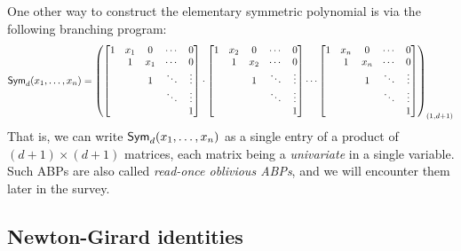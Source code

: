 One other way to construct the elementary symmetric polynomial is via the following branching program:
\[
\operatorname{\mathsf{Sym}}_d(x_1,\ldots, x_n) = \left(\begin{bmatrix} 
  1 & x_1 & 0   & \cdots & 0\\
    & 1   & x_1 & \cdots & 0\\
    &    &  1 & \ddots & \vdots\\
    & &  & \ddots & \vdots\\
  & &  &  & 1
\end{bmatrix}\cdot \begin{bmatrix} 
  1 & x_2 & 0   & \cdots & 0\\
    & 1   & x_2 & \cdots & 0\\
    &    &  1 & \ddots & \vdots\\
    & &  & \ddots & \vdots\\
  & &  &  & 1
\end{bmatrix}
 \cdots \begin{bmatrix} 
  1 & x_n & 0   & \cdots & 0\\
    & 1   & x_n & \cdots & 0\\
    &    &  1 & \ddots & \vdots\\
    & &  & \ddots & \vdots\\
  & &  &  & 1
\end{bmatrix}\right)_{(1,d+1)}
\]
That is, we can write $\operatorname{\mathsf{Sym}}_d(x_1,\dots, x_n)$ as a single entry of a product of $(d+1)\times(d+1)$ matrices, each matrix being a \emph{univariate} in a single variable. Such ABPs are also called \emph{read-once oblivious ABPs}, and we will encounter them later in the survey.

\subsection{Newton-Girard identities}

